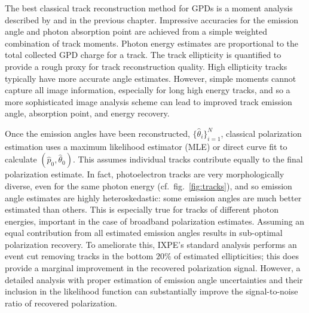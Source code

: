 The best classical track reconstruction method for GPDs is a moment analysis described by \citet{bellazzini_novel_2003} and in the previous chapter. Impressive accuracies for the emission angle and photon absorption point are achieved from a simple weighted combination of track moments. Photon energy estimates are proportional to the total collected GPD charge for a track. The track ellipticity is quantified to provide a rough proxy for track reconstruction quality. High ellipticity tracks typically have more accurate angle estimates. However, simple moments cannot capture all image information, especially for long high energy tracks, and so a more sophisticated image analysis scheme can lead to improved track emission angle, absorption point, and energy recovery.

Once the emission angles have been reconstructed, $\{\hat{\theta}_i\}_{i=1}^N$,
classical polarization estimation uses a maximum likelihood estimator (MLE) or direct curve fit to calculate $(\hat{p}_0, \hat{\theta}_0)$. This assumes individual tracks contribute equally to the final polarization estimate. In fact, photoelectron tracks are very morphologically diverse, even for the same photon energy (cf.~fig.~\ref{fig:tracks}), and so emission angle estimates are highly heteroskedastic: some emission angles are much better estimated than others. 
This is especially true for tracks of different photon energies, important in the case of broadband polarization estimates. Assuming an equal contribution from all estimated emission angles results in sub-optimal polarization recovery. 
To ameliorate this, IXPE's standard analysis performs an event cut removing tracks in the bottom $20\%$ of estimated ellipticities; this does provide a marginal improvement in the recovered polarization signal. However, a detailed analysis with proper estimation of emission angle uncertainties and their inclusion in the likelihood function can substantially improve the signal-to-noise ratio of recovered polarization. 



